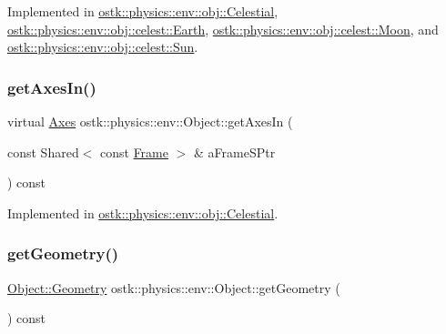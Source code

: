 Implemented in \hyperlink{classostk_1_1physics_1_1env_1_1obj_1_1_celestial_a87c6f3ec3c0ec9758ae52e3edc3fc5df}{ostk\+::physics\+::env\+::obj\+::\+Celestial}, \hyperlink{classostk_1_1physics_1_1env_1_1obj_1_1celest_1_1_earth_ae86664b9d6fc870baa1dac5c3219f784}{ostk\+::physics\+::env\+::obj\+::celest\+::\+Earth}, \hyperlink{classostk_1_1physics_1_1env_1_1obj_1_1celest_1_1_moon_adcfeda7b73d32df67f5b38c05ca9351a}{ostk\+::physics\+::env\+::obj\+::celest\+::\+Moon}, and \hyperlink{classostk_1_1physics_1_1env_1_1obj_1_1celest_1_1_sun_a57fd7c3c48115f77e2d3d331ef0e8e0a}{ostk\+::physics\+::env\+::obj\+::celest\+::\+Sun}.

\mbox{\label{classostk_1_1physics_1_1env_1_1_object_a706d29c77ce311a3abcf2a6060515711}} 
\subsubsection{\texorpdfstring{get\+Axes\+In()}{getAxesIn()}}
{\footnotesize\ttfamily virtual \hyperlink{classostk_1_1physics_1_1coord_1_1_axes}{Axes} ostk\+::physics\+::env\+::\+Object\+::get\+Axes\+In (\begin{DoxyParamCaption}\item[{const Shared$<$ const \hyperlink{classostk_1_1physics_1_1coord_1_1_frame}{Frame} $>$ \&}]{a\+Frame\+S\+Ptr }\end{DoxyParamCaption}) const\hspace{0.3cm}{\ttfamily [pure virtual]}}



Implemented in \hyperlink{classostk_1_1physics_1_1env_1_1obj_1_1_celestial_a52b8cd88b947ca97f94981e5d3e10677}{ostk\+::physics\+::env\+::obj\+::\+Celestial}.

\mbox{\label{classostk_1_1physics_1_1env_1_1_object_aa74070ed996907de5a2821233d1aa555}} 
\subsubsection{\texorpdfstring{get\+Geometry()}{getGeometry()}}
{\footnotesize\ttfamily \hyperlink{classostk_1_1physics_1_1env_1_1_object_a66e44a65aefb23a184a6de531e96935d}{Object\+::\+Geometry} ostk\+::physics\+::env\+::\+Object\+::get\+Geometry (\begin{DoxyParamCaption}{ }\end{DoxyParamCaption}) const}


